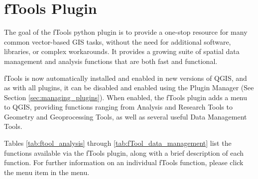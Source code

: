 
\section{fTools Plugin}\label{sec:ftools}

\updatedisclaimer

The goal of the fTools python plugin is to provide a one-stop resource for
many common vector-based GIS tasks, without the need for additional software, 
libraries, or complex workarounds. It provides a growing suite of spatial 
data management and analysis functions that are both fast and functional. 

fTools is now automatically installed and enabled in new versions of QGIS, and as with all plugins, it can 
be disabled and enabled using the Plugin Manager (See Section \ref{sec:managing_plugins}).
When enabled, the fTools plugin adds a  menu to QGIS, providing functions ranging from 
Analysis and Research Tools to Geometry and Geoprocessing Tools, as well as several useful Data Management Tools.

\label{ftool_functions}

Tables \ref{tab:ftool_analysis} through \ref{tab:fTool_data_management} list the 
functions available via the fTools plugin, along with a brief description of 
each function. For further information on an individual fTools function, please 
click the  menu item in the  menu.

